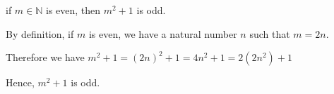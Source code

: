if $m \in \mathbb{N}$ is even, then $m^2 + 1$ is odd.

By definition, if $m$ is even, we have a natural number $n$ such that $m = 2n$.

Therefore we have $m^2 + 1 = (2n)^2 + 1 = 4n ^ 2 + 1 = 2 (2n^2) + 1$

Hence, $m^2 + 1$ is odd.